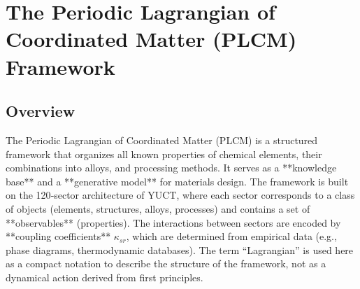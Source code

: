 \documentclass[12pt,a4paper]{article}
\begin{document}
\begin{landscape}
		\vspace{0.2cm}
		\noindent{}
		
		\vspace{0.2cm}
		\noindent\makebox[\linewidth]{%
			\scalebox{0.75}{%
				$\displaystyle
				+
				\underbrace{\lambda_{131} L_{131}^{\text{CALPHAD}}}_{\text{CALPHAD integration}}
				+
				\underbrace{\sum_{s=1}^{80} \kappa_{s,131}^{\text{el-CALPHAD}} \,\mathrm{Tr}(\Psi_{s,131} O_s^{\text{el}} O_{131}^{\text{CALPHAD}\dagger})}_{\text{el–CALPHAD coupling}}
				\Bigg]
				\times \prod_{i=1}^{155} \Theta(P_i - P_{i,\text{crit}})
				$
			}
		}
		\label{fig:full-lagrangian}
	\end{landscape}
	
	\section{The Periodic Lagrangian of Coordinated Matter (PLCM) Framework}
	
	\subsection{Overview}
	
	The Periodic Lagrangian of Coordinated Matter (PLCM) is a structured framework that organizes all known properties of chemical elements, their combinations into alloys, and processing methods. It serves as a **knowledge base** and a **generative model** for materials design. The framework is built on the 120‑sector architecture of YUCT, where each sector corresponds to a class of objects (elements, structures, alloys, processes) and contains a set of **observables** (properties). The interactions between sectors are encoded by **coupling coefficients** \(\kappa_{sr}\), which are determined from empirical data (e.g., phase diagrams, thermodynamic databases). The term “Lagrangian” is used here as a compact notation to describe the structure of the framework, not as a dynamical action derived from first principles.
	
\end{document}
